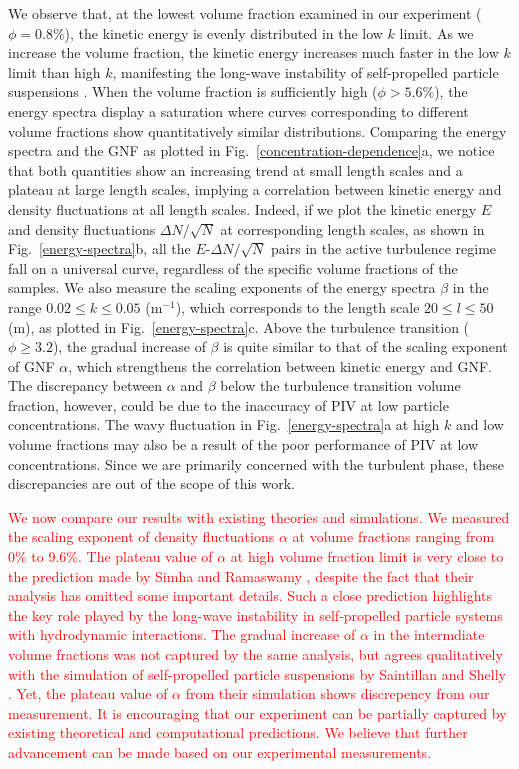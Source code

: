 \documentclass[twocolumn,aps,prl,amsmath,amssymb,longbibliography]{revtex4-2}
\begin{document}
We observe that, at the lowest volume fraction examined in our experiment ($\phi=0.8\%$), the kinetic energy is evenly distributed in the low $k$ limit.
As we increase the volume fraction, the kinetic energy increases much faster in the low $k$ limit than high $k$, manifesting the long-wave instability of self-propelled particle suspensions
\cite{AditiSimha2002, Saintillan2008a, Saintillan2008b,
Subramanian2009, Hohenegger2010, Bardfalvy2019, Peng2020}.
When the volume fraction is sufficiently high ($\phi>5.6\%$), the energy spectra display a saturation where curves corresponding to different volume fractions show quantitatively similar distributions.
Comparing the energy spectra and the GNF as plotted in Fig.~\ref{concentration-dependence}a, we notice that both quantities show an increasing trend at small length scales and a plateau at large length scales, implying a correlation between kinetic energy and density fluctuations at all length scales.
Indeed, if we plot the kinetic energy $E$ and density fluctuations $\Delta N/\sqrt N$ at corresponding length scales, as shown in Fig.~\ref{energy-spectra}b, all the $E$-$\Delta N/\sqrt N$ pairs in the active turbulence regime fall on a universal curve, regardless of the specific volume fractions of the samples.
We also measure the scaling exponents of the energy spectra $\beta$ in the range $0.02\le k \le 0.05$ (\textmu m$^{-1}$), which corresponds to the length scale $20\le l \le 50$ (\textmu m), as plotted in Fig.~\ref{energy-spectra}c. Above the turbulence transition ($\phi\ge 3.2$), the gradual increase of $\beta$ is quite similar to that of the scaling exponent of GNF $\alpha$, which strengthens the correlation between kinetic energy and GNF.
The discrepancy between $\alpha$ and $\beta$ below the turbulence transition volume fraction, however, could be due to the inaccuracy of PIV at low particle concentrations. The wavy fluctuation in Fig.~\ref{energy-spectra}a at high $k$ and low volume fractions may also be a result of the poor performance of PIV at low concentrations. Since we are primarily concerned with the turbulent phase, these discrepancies are out of the scope of this work.

\textcolor{red}{We now compare our results with existing theories and simulations. We measured the scaling exponent of density fluctuations $\alpha$ at volume fractions ranging from 0\% to 9.6\%. The plateau value of $\alpha$ at high volume fraction limit is very close to the prediction made by Simha and Ramaswamy \cite{AditiSimha2002}, despite the fact that their analysis has omitted some important details. Such a close prediction highlights the key role played by the long-wave instability in self-propelled particle systems with hydrodynamic interactions. The gradual increase of $\alpha$ in the intermdiate volume fractions was not captured by the same analysis, but agrees qualitatively with the simulation of self-propelled particle suspensions by Saintillan and Shelly \cite{Saintillan2012}. Yet, the plateau value of $\alpha$ from their simulation shows discrepency from our measurement. It is encouraging that our experiment can be partially captured by existing theoretical and computational predictions. We believe that further advancement can be made based on our experimental measurements.}
\end{document}
